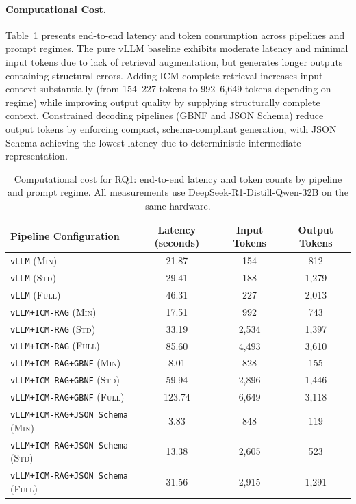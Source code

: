 \documentclass[acmlarge,nonacm]{acmart}
\theoremstyle{acmplain}
\theoremstyle{acmdefinition}
\begin{document}
\paragraph{Computational Cost.} Table~\ref{tab:rq1-latency} presents end-to-end latency and token consumption across pipelines and prompt regimes. The pure vLLM baseline exhibits moderate latency and minimal input tokens due to lack of retrieval augmentation, but generates longer outputs containing structural errors. Adding ICM-complete retrieval increases input context substantially (from 154--227 tokens to 992--6,649 tokens depending on regime) while improving output quality by supplying structurally complete context. Constrained decoding pipelines (GBNF and JSON Schema) reduce output tokens by enforcing compact, schema-compliant generation, with JSON Schema achieving the lowest latency due to deterministic intermediate representation.

\begin{table}[!htbp]
\centering
\small
\caption{Computational cost for RQ1: end-to-end latency and token counts by pipeline and prompt regime. All measurements use DeepSeek-R1-Distill-Qwen-32B on the same hardware.}
\label{tab:rq1-latency}
\begin{tabular}{@{}lccc@{}}
\toprule
\textbf{Pipeline Configuration} & \textbf{Latency (seconds)} & \textbf{Input Tokens} & \textbf{Output Tokens} \\
\midrule
\texttt{vLLM} (\textsc{Min})      & 21.87 & 154  & 812  \\
\texttt{vLLM} (\textsc{Std})      & 29.41 & 188  & 1,279 \\
\texttt{vLLM} (\textsc{Full})     & 46.31 & 227  & 2,013 \\
\midrule
\texttt{vLLM+ICM-RAG} (\textsc{Min})  & 17.51 & 992  & 743  \\
\texttt{vLLM+ICM-RAG} (\textsc{Std})  & 33.19 & 2,534 & 1,397 \\
\texttt{vLLM+ICM-RAG} (\textsc{Full}) & 85.60 & 4,493 & 3,610 \\
\midrule
\texttt{vLLM+ICM-RAG+GBNF} (\textsc{Min})  & 8.01   & 828  & 155  \\
\texttt{vLLM+ICM-RAG+GBNF} (\textsc{Std})  & 59.94  & 2,896 & 1,446 \\
\texttt{vLLM+ICM-RAG+GBNF} (\textsc{Full}) & 123.74 & 6,649 & 3,118 \\
\midrule
\texttt{vLLM+ICM-RAG+JSON Schema} (\textsc{Min})  & 3.83  & 848  & 119  \\
\texttt{vLLM+ICM-RAG+JSON Schema} (\textsc{Std})  & 13.38 & 2,605 & 523  \\
\texttt{vLLM+ICM-RAG+JSON Schema} (\textsc{Full}) & 31.56 & 2,915 & 1,291 \\
\bottomrule
\end{tabular}
\end{table}
\end{document}

